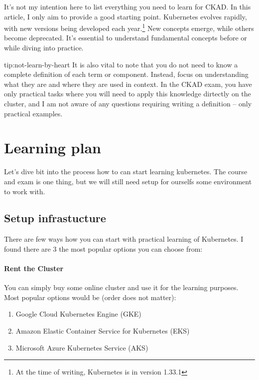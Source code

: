 It's not my intention here to list everything you need to learn for CKAD. In this article, I only aim to provide a good starting point. Kubernetes evolves rapidly, with new versions being developed each year.\footnote{At the time of writing, Kubernetes is in version 1.33.1} New concepts emerge, while others become deprecated. It's essential to understand fundamental concepts before or while diving into practice.

\begin{tip}{tip:not-learn-by-heart}
	It is also vital to note that you do not need to know a complete definition of each term or component. Instead, focus on understanding what they are and where they are used in context. In the CKAD exam, you have only practical tasks where you will need to apply this knowledge dirtectly on the cluster, and I am not aware of any questions requiring writing a definition -- only practical examples.
\end{tip}

\section{Learning plan}

Let's dive bit into the process how to can start learning kubernetes. The course and exam is one thing, but we will still need setup for ourselfs some environment to work with.

\subsection{Setup infrastucture}
\label{subsec:setup-infrastructure}

There are few ways how you can start with practical learning of Kubernetes. I found there are 3 the most popular options you can choose from:


\paragraph{Rent the Cluster} You can simply buy some online cluster and use it for the learning purposes. Most popular options would be (order does not matter): 
\begin{enumerate}
	\item Google Cloud Kubernetes Engine (GKE)
	\item Amazon Elastic Container Service for Kubernetes (EKS)
	\item Microsoft Azure Kubernetes Service (AKS)
\end{enumerate}


